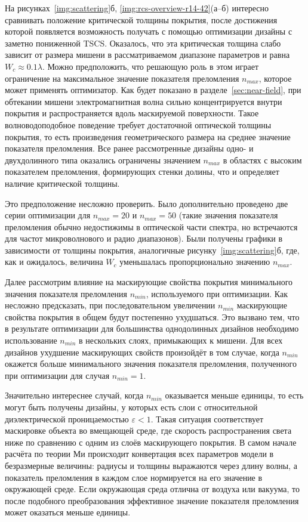 На рисунках~\ref{img:scattering}б,
\ref{img:rcs-overview-r14-42}(а--б) интересно сравнивать положение
критической толщины покрытия, после достижения которой появляется
возможность получать с помощью оптимизации дизайны с заметно
пониженной TSCS.  Оказалось, что эта критическая толщина слабо зависит
от размера мишени в рассматриваемом диапазоне параметров и равна
${W_c \approx 0.1\lambda}$.  Можно предположить, что решающую роль в
этом играет ограничение на максимальное значение показателя
преломления $n_{max}$, которое может применять оптимизатор.  Как будет
показано в разделе~\ref{sec:near-field}, при обтекании мишени
электромагнитная волна сильно концентрируется внутри покрытия
и распространяется вдоль маскируемой поверхности.  Такое волноводоподобное
поведение требует достаточной оптической толщины покрытия, то есть
произведения геометрического размера на среднее значение показателя
преломления. Все ранее рассмотренные дизайны одно- и двухдолинного
типа оказались ограничены значением $n_{max}$ в областях с высоким
показателем преломления, формирующих стенки долины, что и определяет
наличие критической толщины.

Это предположение несложно проверить. Было дополнительно проведено
две серии оптимизации для $n_{max}=20$ и $n_{max}=50$ (такие значения
показателя преломления обычно недостижимы в оптической части спектра,
но встречаются для частот микроволнового и радио диапазонов).
Были получены графики в зависимости от толщины покрытия, аналогичные
рисунку~\ref{img:scattering}б, где, как и ожидалось, величина $W_c$
уменьшалась пропорционально значению $n_{max}$.

Далее рассмотрим влияние на маскирующие свойства покрытия минимального
значения показателя преломления $n_{min}$, используемого при
оптимизации.  Как несложно предсказать, при последовательном
увеличении $n_{min}$ маскирующие свойства покрытия в общем будут
постепенно ухудшаться. Это вызвано тем, что в результате оптимизации
для большинства однодолинных дизайнов необходимо использование
$n_{min}$ в нескольких слоях, примыкающих к мишени. Для всех дизайнов
ухудшение маскирующих свойств произойдёт в том случае, когда $n_{min}$
окажется больше минимального значения показателя преломления,
полученного при оптимизации для случая $n_{min}=1$. 

Значительно интереснее случай, когда $n_{min}$ оказывается меньше
единицы, то есть могут быть получены дизайны, у которых есть слои с
относительной диэлектрической проницаемостью $\varepsilon <1$.  Такая
ситуация соответствует маскировке объекта во вмещающей среде, где
скорость распространения света ниже по сравнению с одним из слоёв
маскирующего покрытия.  В самом начале расчёта по теории Ми происходит
конвертация всех параметров модели в безразмерные величины: радиусы и
толщины выражаются через длину волны, а показатель преломления в
каждом слое нормируется на его значение в окружающей среде. Если
окружающая среда отлична от воздуха или вакуума, то после подобного
преобразования эффективное значение показателя преломления может
оказаться меньше единицы.



